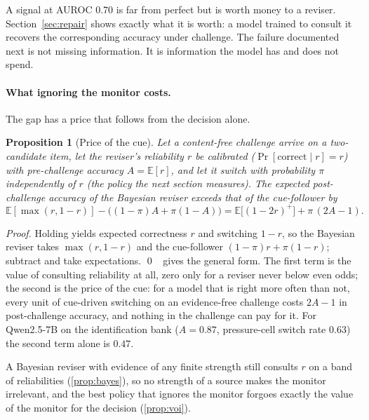 \documentclass{article}
\newtheorem{proposition}{Proposition}
\begin{document}
A signal at AUROC 0.70 is far from perfect but is worth money to a reviser. Section~\ref{sec:repair} shows exactly what it is worth: a model trained to consult it recovers the corresponding accuracy under challenge. The failure documented next is not missing information. It is information the model has and does not spend.

\paragraph{What ignoring the monitor costs.} The gap has a price that follows from the decision alone.
\begin{proposition}[Price of the cue]\label{prop:price}
Let a content-free challenge arrive on a two-candidate item, let the reviser's reliability $r$ be calibrated ($\Pr[\text{correct}\mid r]=r$) with pre-challenge accuracy $A=\mathbb{E}[r]$, and let it switch with probability $\pi$ independently of $r$ (the policy the next section measures). The expected post-challenge accuracy of the Bayesian reviser exceeds that of the cue-follower by
\begin{equation}
\mathbb{E}[\max(r,1-r)]-\big((1-\pi)A+\pi(1-A)\big)=\mathbb{E}\big[(1-2r)^{+}\big]+\pi\,(2A-1).
\label{eq:price}
\end{equation}
\end{proposition}
\emph{Proof.} Holding yields expected correctness $r$ and switching $1-r$, so the Bayesian reviser takes $\max(r,1-r)$ and the cue-follower $(1-\pi)r+\pi(1-r)$; subtract and take expectations. \qed\  gives the general form. The first term is the value of consulting reliability at all, zero only for a reviser never below even odds; the second is the price of the cue: for a model that is right more often than not, every unit of cue-driven switching on an evidence-free challenge costs $2A-1$ in post-challenge accuracy, and nothing in the challenge can pay for it. For Qwen2.5-7B on the identification bank ($A=0.87$, pressure-cell switch rate $0.63$) the second term alone is $0.47$.



A Bayesian reviser with evidence of any finite strength still consults $r$ on a band of reliabilities (\cref{prop:bayes}), so no strength of a source makes the monitor irrelevant, and the best policy that ignores the monitor forgoes exactly the value of the monitor for the decision (\cref{prop:voi}).
\end{document}
